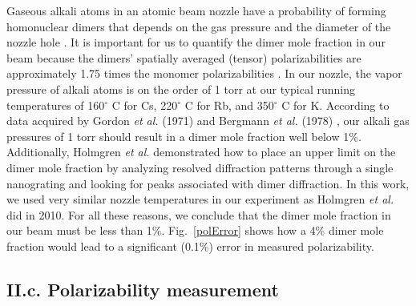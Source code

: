 \documentclass[twocolumn,pra,showpacs,superscriptaddress,longbibliography]{revtex4-1}   %
\newcommand{\figref}[1]{Fig.~\ref{#1}}
\newcommand{\etalspace}{\textit{et al. }}
\begin{document}
Gaseous alkali atoms in an atomic beam nozzle have a probability of forming homonuclear dimers that depends on the gas pressure \cite{Gordon1971} and the diameter of the nozzle hole \cite{Bergmann1978}. It is important for us to quantify the dimer mole fraction in our beam because the dimers' spatially averaged (tensor) polarizabilities are approximately 1.75 times the monomer polarizabilities \cite{Tarnovsky1993}. 
In our nozzle, the vapor pressure of alkali atoms is on the order of 1 torr at our typical running temperatures of 
160$^{\circ}$ C for Cs, 220$^{\circ}$ C for Rb, and 350$^{\circ}$ C for K.
According to data acquired by Gordon \etalspace (1971) \cite{Gordon1971} and Bergmann \etalspace (1978) \cite{Bergmann1978}, our alkali gas pressures of 1 torr should result in a dimer mole fraction well below 1\%.
Additionally, Holmgren \etalspace \cite{Holmgren2010,Holmgren2013} demonstrated how to place an upper limit on the dimer mole fraction by analyzing resolved diffraction patterns through a single nanograting and looking for peaks associated with dimer diffraction. In this work, we used very similar nozzle temperatures in our experiment as Holmgren \etalspace did in 2010. For all these reasons, we conclude that the dimer mole fraction in our beam must be less than 1\%.
\figref{polError} shows how a 4\% dimer mole fraction would lead to a significant (0.1\%) error in measured polarizability.


\subsection{II.c. Polarizability measurement}
\end{document}
